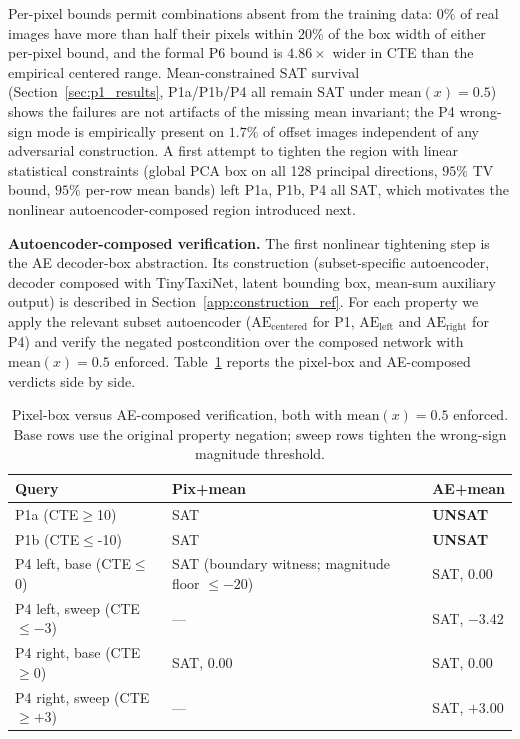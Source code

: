 \documentclass[twocolumn,smallextended,runningheads]{svjour3}
\newcommand{\sttttablefont}{\footnotesize}
\begin{document}
Per-pixel bounds permit combinations absent from the training data: $0\%$ of real images have more than half their pixels within $20\%$ of the box width of either per-pixel bound, and the formal P6 bound is $4.86\times$ wider in CTE than the empirical centered range. Mean-constrained SAT survival (Section~\ref{sec:p1_results}, P1a/P1b/P4 all remain SAT under $\text{mean}(x){=}0.5$) shows the failures are not artifacts of the missing mean invariant; the P4 wrong-sign mode is empirically present on $1.7\%$ of offset images independent of any adversarial construction. A first attempt to tighten the region with linear statistical constraints (global PCA box on all 128 principal directions, $95\%$ TV bound, $95\%$ per-row mean bands) left P1a, P1b, P4 all SAT, which motivates the nonlinear autoencoder-composed region introduced next.

\textbf{Autoencoder-composed verification.} The first nonlinear tightening step is the AE decoder-box abstraction. Its construction (subset-specific autoencoder, decoder composed with TinyTaxiNet, latent bounding box, mean-sum auxiliary output) is described in Section~\ref{app:construction_ref}. For each property we apply the relevant subset autoencoder ($\mathrm{AE}_\text{centered}$ for P1, $\mathrm{AE}_\text{left}$ and $\mathrm{AE}_\text{right}$ for P4) and verify the negated postcondition over the composed network with $\text{mean}(x) = 0.5$ enforced. Table~\ref{tab:plausibility_constrained} reports the pixel-box and AE-composed verdicts side by side.

\begin{table}[htbp]
\centering
\sttttablefont
\setlength{\tabcolsep}{6pt}
\begin{tabular}{lll}
\toprule
Query & Pix+mean & AE+mean \\
\midrule
P1a (CTE$\ge$10) & SAT & \textbf{UNSAT} \\
P1b (CTE$\le${-}10) & SAT & \textbf{UNSAT} \\
P4 left, base (CTE$\le$0) & SAT (boundary witness; magnitude floor $\le -20$) & SAT, $0.00$ \\
P4 left, sweep (CTE$\le$$-$3) & --- & SAT, $-$3.42 \\
P4 right, base (CTE$\ge$0) & SAT, 0.00 & SAT, 0.00 \\
P4 right, sweep (CTE$\ge$$+$3) & --- & SAT, $+$3.00 \\
\bottomrule
\end{tabular}
\caption{Pixel-box versus AE-composed verification, both with $\mathrm{mean}(x)=0.5$ enforced. Base rows use the original property negation; sweep rows tighten the wrong-sign magnitude threshold.}
\label{tab:plausibility_constrained}
\end{table}
\end{document}
